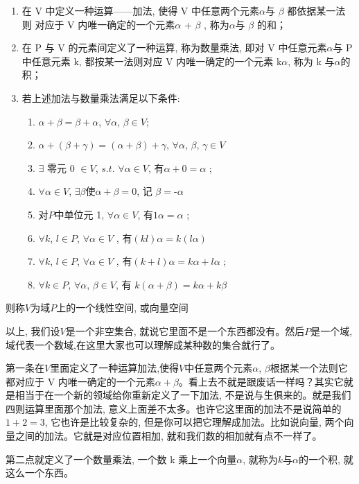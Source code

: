 \begin{enumerate}
  \item 在 V 中定义一种运算——加法, 使得 V 中任意两个元素$\alpha$与 $\beta$ 都依据某一法则 对应于 V 内唯一确定的一个元素$\alpha$ + $\beta$ , 称为$\alpha$与 $\beta$ 的和；
  \item 在 P 与 V 的元素间定义了一种运算, 称为数量乘法, 即对 V 中任意元素$\alpha$与 P 中任意元素 k, 都按某一法则对应 V 内唯一确定的一个元素 k$\alpha$, 称为 k 与$\alpha$的积；
  \item 若上述加法与数量乘法满足以下条件: 
  \begin{enumerate}
   \item $\alpha+\beta=\beta+\alpha$, $\forall\alpha$, $\beta\in V$; 
   \item $\alpha+(\beta+\gamma) = (\alpha+\beta)+\gamma$, $\forall\alpha$, $\beta$, $\gamma\in V$ 
   \item $\exists$ 零元 0 $\in V$, $s.t.$ $\forall\alpha\in V$, 有$\alpha+0 = \alpha$ ;
   \item $\forall\alpha\in V$, $\exists\beta$使$\alpha+\beta = 0$, 记 $\beta = \mbox{-}\alpha$
   \item 对$P$中单位元 1, $\forall\alpha\in V$, 有$1\alpha = \alpha$ ;
   \item $\forall k$,  $l\in P$, $\forall\alpha\in V$ , 有$(kl)\alpha =  k(l\alpha)$ 
   \item $\forall k$,  $l\in P$, $\forall\alpha\in V$ , 有$(k+ l)\alpha =  k\alpha+ l\alpha$ ; 
   \item $\forall k\in P$, $\forall\alpha$, $\beta\in V$, 有 $k(\alpha+\beta) =  k\alpha+ k\beta$ 
  \end{enumerate}
\end{enumerate}

则称$V$为域$P$上的一个线性空间, 或向量空间

以上, 我们设$V$是一个非空集合, 就说它里面不是一个东西都没有。然后$P$是一个域, 域代表一个数域,在这里大家也可以理解成某种数的集合就行了。

第一条在$V$里面定义了一种运算加法,使得$V$中任意两个元素$\alpha$, $\beta$根据某一个法则它都对应于 V 内唯一确定的一个元素$\alpha+\beta$。看上去不就是跟废话一样吗？其实它就是相当于在一个新的领域给你重新定义了一下加法, 不是说与生俱来的。就是我们四则运算里面那个加法, 意义上面差不太多。也许它这里面的加法不是说简单的$1+2=3$, 它也许是比较复杂的, 但是你可以把它理解成加法。比如说向量, 两个向量之间的加法。它就是对应位置相加, 就和我们数的相加就有点不一样了。

第二点就定义了一个数量乘法, 一个数 k 乘上一个向量$\alpha$, 就称为$k$与$\alpha$的一个积, 就这么一个东西。

